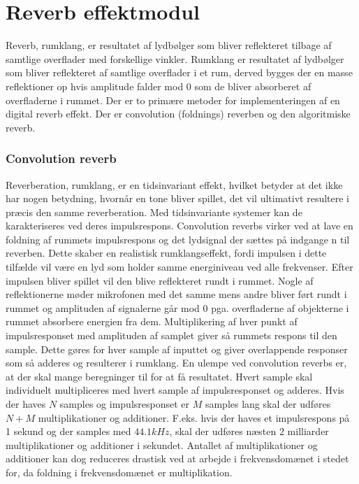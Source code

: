 \chapter{Reverb effektmodul}\label{chap:reverb}
Reverb, rumklang, er resultatet af lydbølger som bliver reflekteret tilbage af samtlige overflader med forskellige vinkler.\newline
Rumklang er resultatet af lydbølger som bliver reflekteret af samtlige overflader i et rum, derved bygges der en masse reflektioner op hvis amplitude falder mod $0$ som de bliver absorberet af overfladerne i rummet.\newline
Der er to primære metoder for implementeringen af en digital reverb effekt.
Der er convolution (foldnings) reverben og den algoritmiske reverb.
\subsection{Convolution reverb}
Reverberation, rumklang, er en tidsinvariant effekt, hvilket betyder at det ikke har nogen betydning, hvornår en tone bliver spillet, det vil ultimativt resultere i præcis den samme reverberation. \newline
Med tidsinvariante systemer kan de karakteriseres ved deres impulsrespons.
Convolution reverbs virker ved at lave en foldning af rummets impulsrespons og det lydsignal der sættes på indgange n til reverben.\newline
Dette skaber en realistisk rumklangseffekt, fordi impulsen i dette tilfælde vil være en lyd som holder samme energiniveau ved alle frekvenser.
Efter impulsen bliver spillet vil den blive reflekteret rundt i rummet.
Nogle af reflektionerne møder mikrofonen med det samme mens andre bliver ført rundt i rummet og amplituden af signalerne går mod $0$ pga. overfladerne af objekterne i rummet absorbere energien fra dem.\newline
Multiplikering af hver punkt af impulsresponset med amplituden af samplet giver så rummets respons til den sample.
Dette gøres for hver sample af inputtet og giver overlappende responser som så adderes og resulterer i rumklang.
En ulempe ved convolution reverbs er, at der skal mange beregninger til for at få resultatet.
Hvert sample skal individuelt multipliceres med hvert sample af impulsresponset og adderes.
Hvis der haves $N$ samples og impulsresponset er $M$ samples lang skal der udføres $N+M$ multiplikationer og additioner.
F.eks. hvis der haves et impulsrespons på 1 sekund og der samples med $44.1\si{kHz}$, skal der udføres næsten 2 milliarder multiplikationer og additioner i sekundet.
Antallet af multiplikationer og additioner kan dog reduceres drastisk ved at arbejde i frekvensdomænet i stedet for, da foldning i frekvensdomænet er multiplikation.

